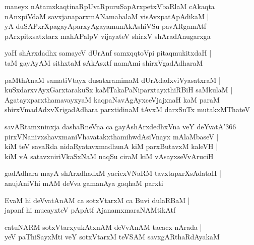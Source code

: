 \documentclass[twoside,12pt,openright]{book}
\newcounter{shloka}[chapter]
\begin{document}
\begin{shloka}%
maneyx nAtamxkaqtinaRpUvaRpuruSapArxpetxVbaRlaM cAkaqta \\
nAnxpiVdaM savxjanaparxmANamabalaM visAvxpatApAdikaM |\\
yA duSAPxrXpagayAparxyAgayamunAkAshiVSu pavARgamAtf \\
pArxpitxsatxtarx mahAPalpV vijayateV shirxV shAradAnugarxga
\end{shloka}

\begin{shloka}%
yaH shArxdadhx samayeV dUrAnf samxqqtoVpi pitaqmukitxdaH |\\
taM gayAyAM sithxtaM sAkAsxtf namAmi shirxVgadAdharaM 
\end{shloka}

\begin{shloka}%
paMthAnaM samatiVtayx dusatxramimaM dUrAdadxviVyasatxraM |\\
kuSxdarxvAyxGarxtarakuSx kaMTakaPaNiparxtayxthiRBiH saMkulaM  |\\
AgatayxparxthamavayxyaM kaqpaNavAgAyxceVjajxnaH kaM paraM \\
shirxVmadAdxvXrigadAdhara parxtidinaM tAvxM darxSuTx mutakxMThateV
\end{shloka}

\begin{shloka}%
savARtamxninxja dashaRneVna ca gayAshArxdedhxVna veY deYvatA\char'366 ~\\
pirxVNanivxshavxmaniVhavatakxthamihwdAsiVnayx mAlaMbaseV |\\
kiM teV savaRda nidaRyatavxmadhunA kiM parxButavxM kaleVH |\\
kiM vA satavxniriVkaSxNaM naqSu ciraM kiM vAsayxseVvAruciH
\end{shloka}

\begin{shloka}%
gadAdhara mayA shArxdhadxM yacicxVNaRM tavxtapxrXsAdataH |\\
anujAniVhi mAM deVva gamanAya gaqhaM parxti 
\end{shloka}

\begin{shloka}%
EvaM hi deVvatAnAM ca sotxVtarxM ca Buvi dulaRBaM |\\
japanf hi mucayxteV pApAtf AjanamxmaraNAMtikAtf 
\end{shloka}

\begin{shloka}%
catuNARM sotxVtarxyukAtxnAM deVvAnAM tacacx nArada |\\
yeV paThiSayxMti veY sotxVtarxM teVSAM savxgARthaRdAyakaM
\end{shloka}
\end{document}
